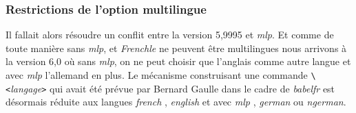 \documentclass[a4paper,12pt,openright]{article}
\begin{document}
%
\subsubsection{Restrictions de l'option multilingue}

\MAJ Il fallait alors résoudre un conflit entre la version 5,9995 et \textsl{mlp}.
Et comme de toute manière sans \textsl{mlp},  \slefr{} et {\sl Frenchle}
ne peuvent être multilingues nous arrivons à la version 6,0 où sans \textsl{mlp},
on ne peut choisir que l'anglais comme autre langue et avec \textsl{mlp}
l'allemand en plus.
Le mécanisme construisant une commande  \verb|\<|{\em langage}\verb|>| qui avait été prévue
par Bernard Gaulle dans le cadre de \textsl{babelfr}
est désormais réduite aux langues  \textsl{french} , \textsl{english}  et avec \textsl{mlp} , \textsl{german} ou \textsl{ngerman}.%
\endMAJ
\end{document}
